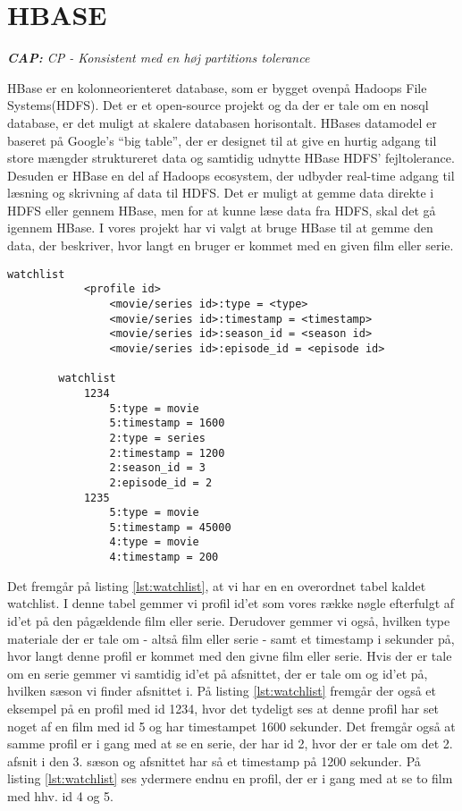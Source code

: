 \section{HBASE}
\begin{displayquote}
    \textit{\textbf{CAP:} CP - Konsistent med en høj partitions tolerance}
\end{displayquote}

HBase er en kolonneorienteret database, som er bygget ovenpå Hadoops File Systems(HDFS). Det er et open-source projekt og da der er tale om en nosql database, er det muligt at skalere databasen horisontalt. HBases datamodel er baseret på Google’s “big table”, der er designet til at give en hurtig adgang til store mængder struktureret data og samtidig udnytte HBase HDFS’ fejltolerance. Desuden er HBase en del af Hadoops ecosystem, der udbyder real-time adgang til læsning og skrivning af data til HDFS. Det er muligt at gemme data direkte i HDFS eller gennem HBase, men for at kunne læse data fra HDFS, skal det gå igennem HBase. I vores projekt har vi valgt at bruge HBase til at gemme den data, der beskriver, hvor langt en bruger er kommet med en given film eller serie.
\begin{tcolorbox}
    \lstset{style=htmlstyle}
    \begin{lstlisting}[language={[Sharp]C}, caption={Watchlist HBASE Model}, label={lst:watchlist}]
        watchlist
            <profile id>
                <movie/series id>:type = <type>
                <movie/series id>:timestamp = <timestamp>
                <movie/series id>:season_id = <season id>
                <movie/series id>:episode_id = <episode id>

        watchlist
            1234
                5:type = movie
                5:timestamp = 1600
                2:type = series
                2:timestamp = 1200
                2:season_id = 3
                2:episode_id = 2
            1235
                5:type = movie
                5:timestamp = 45000
                4:type = movie
                4:timestamp = 200
    \end{lstlisting}
\end{tcolorbox}
Det fremgår på listing \ref{lst:watchlist}, at vi har en en overordnet tabel kaldet watchlist. I denne tabel gemmer vi profil id’et som vores række nøgle efterfulgt af id’et på den pågældende film eller serie. Derudover gemmer vi også, hvilken type materiale der er tale om - altså film eller serie - samt et timestamp i sekunder på, hvor langt denne profil er kommet med den givne film eller serie. Hvis der er tale om en serie gemmer vi samtidig id’et på afsnittet, der er tale om og id’et på, hvilken sæson vi finder afsnittet i. På listing \ref{lst:watchlist} fremgår der også et eksempel på en profil med id 1234, hvor det tydeligt ses at denne profil har set noget af en film med id 5 og har timestampet 1600 sekunder. Det fremgår også at samme profil er i gang med at se en serie, der har id 2, hvor der er tale om det 2. afsnit i den 3. sæson og afsnittet har så et timestamp på 1200 sekunder. På listing \ref{lst:watchlist} ses ydermere endnu en profil, der er i gang med at se to film med hhv. id 4 og 5.
\bigbreak

